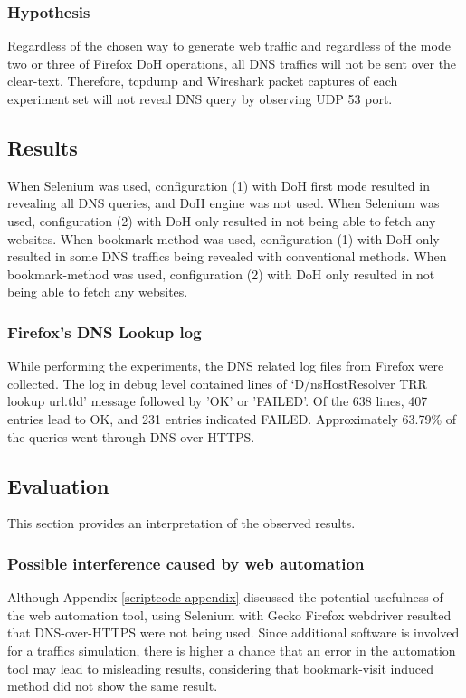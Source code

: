 \subsubsection{Hypothesis}
Regardless of the chosen way to generate web traffic and regardless of the mode two or three of Firefox DoH operations, all DNS traffics will not be sent over the clear-text. Therefore, tcpdump and Wireshark packet captures of each experiment set will not reveal DNS query by observing UDP 53 port.

\subsection{Results}
When Selenium was used, configuration (1) with DoH first mode resulted in revealing all DNS queries, and DoH engine was not used.
When Selenium was used, configuration (2) with DoH only resulted in not being able to fetch any websites.
When bookmark-method was used, configuration (1) with DoH only resulted in some DNS traffics being revealed with conventional methods.
When bookmark-method was used, configuration (2) with DoH only resulted in not being able to fetch any websites.

\subsubsection{Firefox's DNS Lookup log}
While performing the experiments, the DNS related log files from Firefox were collected.
The log in debug level contained lines of `D/nsHostResolver TRR lookup url.tld' message followed by 'OK' or 'FAILED'.
Of the 638 lines, 407 entries lead to OK, and  231 entries indicated FAILED.
Approximately 63.79\% of the queries went through DNS-over-HTTPS.

\subsection{Evaluation}
This section provides an interpretation of the observed results.

\subsubsection{Possible interference caused by web automation}
Although Appendix \ref{scriptcode-appendix} discussed the potential usefulness of the web automation tool, using Selenium with Gecko Firefox webdriver resulted that DNS-over-HTTPS were not being used.
Since additional software is involved for a traffics simulation, there is higher a chance that an error in the automation tool may lead to misleading results, considering that bookmark-visit induced method did not show the same result.

